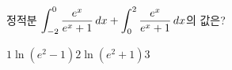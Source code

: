 정적분 $\displaystyle\int_{-2}^{0}\dfrac{e^x}{e^x+1}\mkern3mu dx+\int_{0}^{2}\dfrac{e^x}{e^x+1}\mkern3mu dx$의 값은?
\begin{choices32}{$1$}{$\ln(e^2-1)$}{$2$}{$\ln(e^2+1)$}{$3$}\end{choices32}
